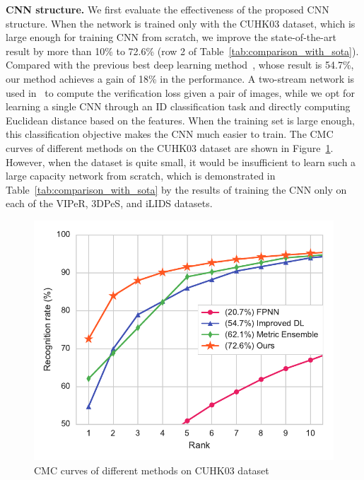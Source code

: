 \textbf{CNN structure.} We first evaluate the effectiveness of the proposed CNN structure. When the network is trained only with the CUHK03 dataset, which is large enough for training CNN from scratch, we improve the state-of-the-art result by more than 10\% to 72.6\% (row 2 of Table~\ref{tab:comparison_with_sota}). Compared with the previous best deep learning method~\cite{ahmed2015improved}, whose result is 54.7\%, our method achieves a gain of 18\% in the performance. A two-stream network is used in~\cite{ahmed2015improved} to compute the verification loss given a pair of images, while we opt for learning a single CNN through an ID classification task and directly computing Euclidean distance based on the features. When the training set is large enough, this classification objective makes the CNN much easier to train. The CMC curves of different methods on the CUHK03 dataset are shown in Figure~\ref{fig:cmc_cuhk03}. However, when the dataset is quite small, it would be insufficient to learn such a large capacity network from scratch, which is demonstrated in Table~\ref{tab:comparison_with_sota} by the results of training the CNN only on each of the VIPeR, 3DPeS, and iLIDS datasets.

\begin{figure}[t]
\begin{center}
\includegraphics[width=1.0\linewidth]{figures/multi_domain/cmc_cuhk03.pdf}
\end{center}
\caption{CMC curves of different methods on CUHK03 dataset}
\label{fig:cmc_cuhk03}
\end{figure}

